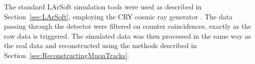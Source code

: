 The standard LArSoft simulation tools were used as described in Section~\ref{sec:LArSoft}, employing the CRY cosmic ray generator \cite{CRY2007}.  The data passing through the detector were filtered on counter coincidences, exactly as the raw data is triggered.  The simulated data was then processed in the same way as the real data and reconstructed using the methods described in Section~\ref{sec:ReconstructingMuonTracks}.






